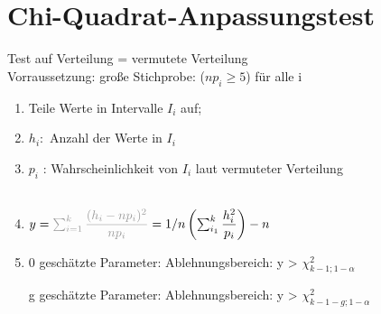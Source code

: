 \section*{Chi-Quadrat-Anpassungstest}
Test auf Verteilung = vermutete Verteilung\\
Vorraussetzung: große Stichprobe: ($np_i \geq 5$) für alle i

\begin{enumerate}
\item Teile Werte in Intervalle $I_i$ auf; 
\item $h_i:$ Anzahl der Werte in $I_i$  
\item $p_i$ : Wahrscheinlichkeit von $I_i$ laut vermuteter Verteilung \\
\\

\item $y = \gray{ \sum_{i=1}^k \dfrac{(h_i -np_i)^2}{n p_i} }= 1/n \left( \sum_{i_1}^k \dfrac{h_i^2}{p_i} \right) -n $
\\

\item 0 geschätzte Parameter: Ablehnungsbereich: y > $\chi^2_{k-1;1-\alpha}$

g geschätzte Parameter: Ablehnungsbereich: y > $\chi^2_{k-1-g;1-\alpha}$

\end{enumerate}